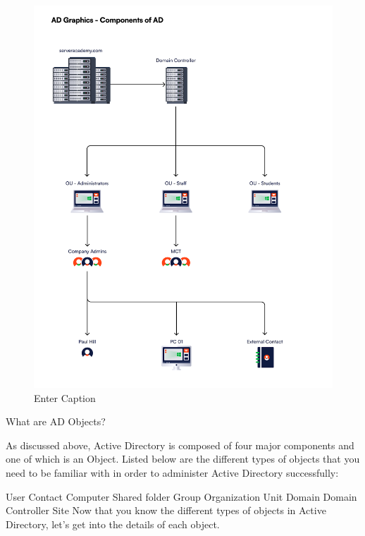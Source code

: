 \begin{figure}
    \centering
    \includegraphics[width=0.75\linewidth]{adcomp.png}
    \caption{Enter Caption}
    \label{fig:placeholder}
\end{figure}

What are AD Objects?

As discussed above, Active Directory is composed of four major components and one of which is an Object. Listed below are the different types of objects that you need to be familiar with in order to administer Active Directory successfully:

User
Contact
Computer
Shared folder
Group
Organization Unit
Domain
Domain Controller
Site
Now that you know the different types of objects in Active Directory, let’s get into the details of each object.

